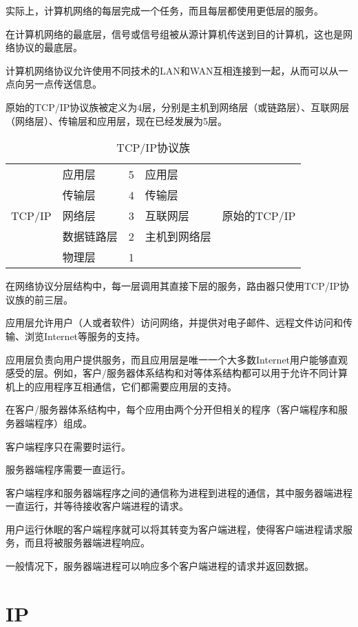 实际上，计算机网络的每层完成一个任务，而且每层都使用更低层的服务。

在计算机网络的最底层，信号或信号组被从源计算机传送到目的计算机，这也是网络协议的最底层。

计算机网络协议允许使用不同技术的LAN和WAN互相连接到一起，从而可以从一点向另一点传送信息。

原始的TCP/IP协议族被定义为4层，分别是主机到网络层（或链路层）、互联网层（网络层）、传输层和应用层，现在已经发展为5层。

\begin{table}[htbp]
\centering
\caption{TCP/IP协议族}
\begin{tabular}{|l|l|l|l|l|}
\hline
	& 应用层 & 5 & 应用层 & \\ \cline{2-4}
	&传输层 & 4 & 传输层 & \\ \cline{2-4}
TCP/IP&网络层 & 3 & 互联网层 & 原始的TCP/IP\\ \cline{2-4}
	&数据链路层 & 2 & 主机到网络层 & \\ \cline{2-4}
	&物理层 & 1 & & \\
\hline
\end{tabular}
\end{table}

在网络协议分层结构中，每一层调用其直接下层的服务，路由器只使用TCP/IP协议族的前三层。

应用层允许用户（人或者软件）访问网络，并提供对电子邮件、远程文件访问和传输、浏览Internet等服务的支持。

应用层负责向用户提供服务，而且应用层是唯一一个大多数Internet用户能够直观感受的层。例如，客户/服务器体系结构和对等体系结构都可以用于允许不同计算机上的应用程序互相通信，它们都需要应用层的支持。

在客户/服务器体系结构中，每个应用由两个分开但相关的程序（客户端程序和服务器端程序）组成。

\begin{compactitem}
\item 客户端程序只在需要时运行。
\item 服务器端程序需要一直运行。
\end{compactitem}

客户端程序和服务器端程序之间的通信称为进程到进程的通信，其中服务器端进程一直运行，并等待接收客户端进程的请求。

用户运行休眠的客户端程序就可以将其转变为客户端进程，使得客户端进程请求服务，而且将被服务器端进程响应。

一般情况下，服务器端进程可以响应多个客户端进程的请求并返回数据。

\section{IP}


